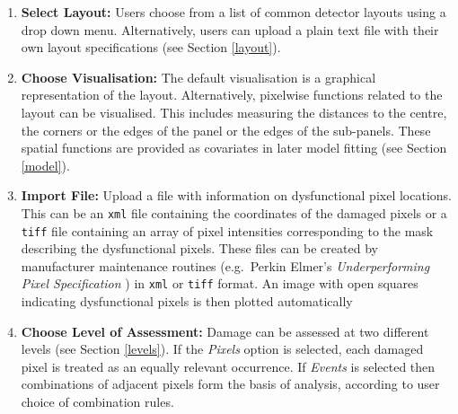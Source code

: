 \documentclass[11pt,a4paper]{article}
\begin{document}
\begin{mdframed}

\medskip

\begin{enumerate}

\item {\bf Select Layout:} 
Users choose from a list of common detector layouts using a drop down menu. Alternatively, users can upload a plain text file with their own layout specifications (see Section \ref{layout}). 

\item {\bf Choose Visualisation:} 
The default visualisation is a graphical representation of the layout.
Alternatively, pixelwise functions related to the layout can be visualised. This includes 
measuring the distances to the centre, the corners or the edges of the panel or the edges 
of the sub-panels. 
These spatial functions are provided as covariates in later model fitting (see Section \ref{model}).

\item {\bf Import File:} 
Upload a file with information on dysfunctional pixel locations.
This can be an \texttt{xml} file containing the coordinates of the damaged pixels or a \texttt{tiff} file containing an array of pixel intensities corresponding to the mask 
describing the dysfunctional pixels. 
These files can be created by manufacturer maintenance routines (e.g.~Perkin Elmer's \emph{Underperforming Pixel Specification}
\cite[Section 5.2]{manualXRD1621}) in \texttt{xml} or \texttt{tiff} format. An image with open squares indicating dysfunctional pixels
is then plotted automatically 

\item {\bf Choose Level of Assessment:} 
Damage can be assessed at two different levels (see Section \ref{levels}). If the \emph{Pixels} option is selected, each damaged pixel is treated as an equally relevant occurrence. If \emph{Events} is selected then combinations of adjacent pixels form the basis of analysis, according to user choice of combination rules. 


\end{enumerate}
\end{mdframed}
\end{document}
